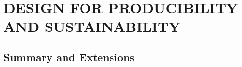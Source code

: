 \chapter{DESIGN FOR PRODUCIBILITY AND SUSTAINABILITY}\label{chap:20}


\section{Summary and Extensions}


\begin{exercises}
    \begin{exercise}
    \label{}
    
    \end{exercise}
    \begin{solution}
    \end{solution}

\end{exercises}